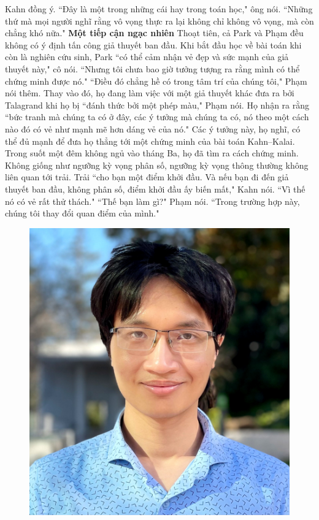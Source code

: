 \begin{multicols}{2}
	\vskip 0.1cm
	Kahn đồng ý. ``Đây là một trong những cái hay trong toán học," ông nói.
	\vskip 0.1cm 
	``Những thứ mà mọi người nghĩ rằng vô vọng thực ra lại không chỉ không vô vọng, mà còn chẳng khó nữa."
	\vskip 0.1cm
	\textbf{\color{duongvaotoanhoc}Một tiếp cận ngạc nhiên}
	\vskip 0.1cm
	Thoạt tiên, cả Park và Phạm đều không có ý định tấn công giả thuyết ban đầu. Khi bắt đầu học về bài toán khi còn là nghiên cứu sinh, Park ``có thể cảm nhận vẻ đẹp và sức mạnh của giả thuyết này," cô nói. ``Nhưng tôi chưa bao giờ tưởng tượng ra rằng mình có thể chứng minh được nó."
	\vskip 0.1cm
	``Điều đó chẳng hề có trong tâm trí của chúng tôi," Phạm nói thêm.
	\vskip 0.1cm
	Thay vào đó, họ đang làm việc với một giả thuyết khác đưa ra bởi Talagrand khi họ bị ``đánh thức bởi một phép màu," Phạm nói. Họ nhận ra rằng ``bức tranh mà chúng ta có ở đây, các ý tưởng mà chúng ta có, nó theo một cách nào đó có vẻ như mạnh mẽ hơn dáng vẻ của nó." Các ý tưởng này, họ nghĩ, có thể đủ mạnh để đưa họ thẳng tới một chứng minh của bài toán Kahn--Kalai.
	\vskip 0.1cm
	Trong suốt một đêm không ngủ vào tháng Ba, họ đã tìm ra cách chứng minh.
	\vskip 0.1cm
	Không giống như ngưỡng kỳ vọng phân số, ngưỡng kỳ vọng thông thường không liên quan tới trải. Trải ``cho bạn một điểm khởi đầu. Và nếu bạn đi đến giả thuyết ban đầu, không phân số, điểm khởi đầu ấy biến mất," Kahn nói. ``Vì thế nó có vẻ rất thử thách."
	\vskip 0.1cm
	``Thế bạn làm gì?" Phạm nói. ``Trong trường hợp này, chúng tôi thay đổi quan điểm của mình."
	\begin{figure}[H]
		\vspace*{-5pt}
		\centering
		\captionsetup{labelformat= empty, justification=centering}
		\includegraphics[width= 1\linewidth]{4}

\end{figure}
\end{multicols}
